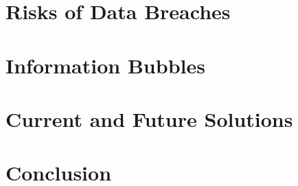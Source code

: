 \documentclass[10pt,twoside,slovak,a4paper]{article}
\begin{document}
\section{Risks of Data Breaches} \label{Risks of Data Breaches}

\section{Information Bubbles} \label{Information Bubbles}

\section{Current and Future Solutions} \label{Current and Future Solutions}

\section{Conclusion} \label{Conclusion}





\end{document}
